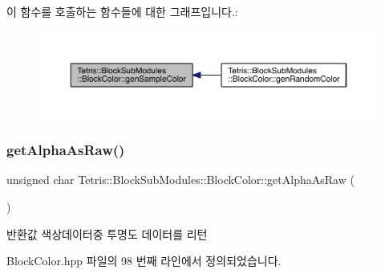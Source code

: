 이 함수를 호출하는 함수들에 대한 그래프입니다.\+:
\nopagebreak
\begin{figure}[H]
\begin{center}
\leavevmode
\includegraphics[width=350pt]{class_tetris_1_1_block_sub_modules_1_1_block_color_a624fe688c2889c345cb8dff757f06ef9_icgraph}
\end{center}
\end{figure}
\mbox{\label{class_tetris_1_1_block_sub_modules_1_1_block_color_acb1c9b34ee534857741025bd2824201a}} 
\subsubsection{\texorpdfstring{get\+Alpha\+As\+Raw()}{getAlphaAsRaw()}}
{\footnotesize\ttfamily unsigned char Tetris\+::\+Block\+Sub\+Modules\+::\+Block\+Color\+::get\+Alpha\+As\+Raw (\begin{DoxyParamCaption}{ }\end{DoxyParamCaption})\hspace{0.3cm}{\ttfamily [inline]}}

\begin{DoxyReturn}{반환값}
색상데이터중 투명도 데이터를 리턴 
\end{DoxyReturn}


Block\+Color.\+hpp 파일의 98 번째 라인에서 정의되었습니다.

